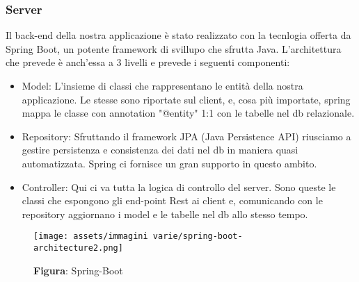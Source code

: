 \subsubsection{Server}
\begin{flushleft}
    Il back-end della nostra applicazione è stato realizzato con la tecnlogia offerta da Spring Boot, un potente framework di svillupo che sfrutta Java.
    L'architettura che prevede è anch'essa a 3 livelli e prevede i seguenti componenti:
    \begin{itemize}
        \item Model: L'insieme di classi che rappresentano le entità della nostra applicazione. Le stesse sono riportate sul client, e, cosa più importate, spring mappa le classe con annotation "@entity" 1:1 con le tabelle nel db relazionale.\\
              
        \item Repository: Sfruttando il framework JPA (Java Persistence API) riusciamo a gestire persistenza e consistenza dei dati nel db in maniera quasi automatizzata. Spring ci fornisce un gran supporto in questo ambito.
        \item Controller: Qui ci va tutta la logica di controllo del server. Sono queste le classi che espongono gli end-point Rest ai client e, comunicando con le repository aggiornano i model e le tabelle nel db allo stesso tempo.
    \end{itemize}
\end{flushleft}

\begin{figure}[H]
    \centering
    \texttt{[image: assets/immagini varie/spring-boot-architecture2.png]}
    \caption*{\textbf{Figura}: Spring-Boot}\label{fig:spring_Arch}
\end{figure}

